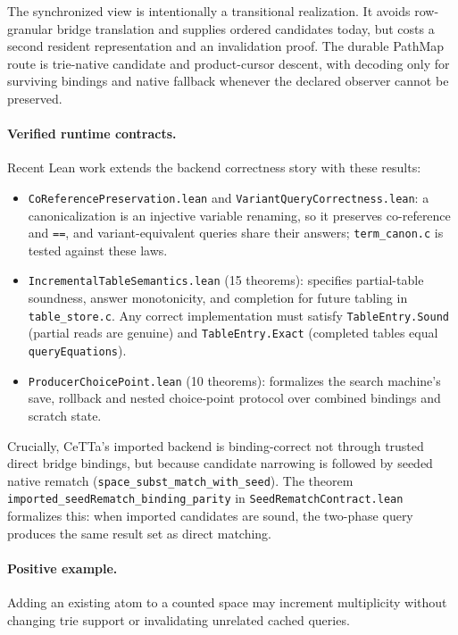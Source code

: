 \documentclass[11pt]{article}
\newcommand{\code}[1]{\texttt{#1}}
\newcommand{\CeTTa}{\textup{CeTTa}}
\newcommand{\PathMap}{\textup{PathMap}}
\begin{document}
The synchronized view is intentionally a transitional realization.  It
avoids row-granular bridge translation and supplies ordered candidates today,
but costs a second resident representation and an invalidation proof.  The
durable \PathMap{} route is trie-native candidate and product-cursor descent,
with decoding only for surviving bindings and native fallback whenever the
declared observer cannot be preserved.

\paragraph{Verified runtime contracts.}
Recent Lean work extends the backend correctness story with these results:
\begin{itemize}
\item \code{CoReferencePreservation.lean} and \code{VariantQueryCorrectness.lean}: a canonicalization is an injective variable renaming, so it preserves co-reference and \code{==}, and variant-equivalent queries share their answers; \code{term\_canon.c} is tested against these laws.
\item \code{IncrementalTableSemantics.lean} (15 theorems): specifies partial-table soundness, answer monotonicity, and completion for future tabling in \code{table\_store.c}.  Any correct implementation must satisfy \code{TableEntry.Sound} (partial reads are genuine) and \code{TableEntry.Exact} (completed tables equal \code{queryEquations}).
\item \code{ProducerChoicePoint.lean} (10 theorems): formalizes the search machine's save, rollback and nested choice-point protocol over combined bindings and scratch state.
\end{itemize}

Crucially, \CeTTa{}'s imported backend is binding-correct not through trusted direct bridge bindings, but because candidate narrowing is followed by seeded native rematch (\code{space\_subst\_match\_with\_seed}).  The theorem \code{imported\_seedRematch\_binding\_parity} in \code{SeedRematchContract.lean} formalizes this: when imported candidates are sound, the two-phase query produces the same result set as direct matching.

\paragraph{Positive example.}
Adding an existing atom to a counted space may increment multiplicity without
changing trie support or invalidating unrelated cached queries.
\end{document}
